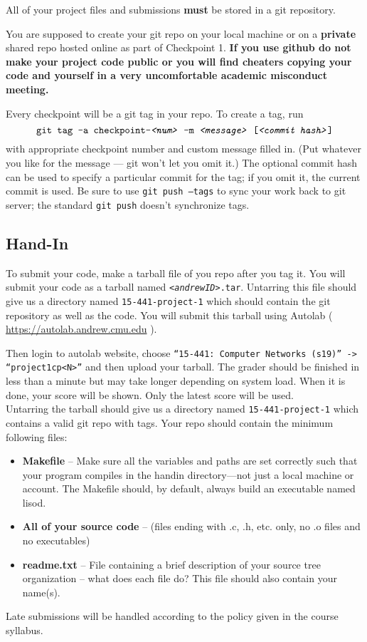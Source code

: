 All of your project files and submissions \textbf{must} be stored in a git repository.

You are supposed to create your git repo on your local machine or on a \textbf{private} shared repo hosted
online as part of
Checkpoint 1. 
{\bf If you use github do not make your project code public or you will find cheaters copying your code and yourself in a very uncomfortable academic misconduct meeting.}

Every checkpoint will be a git tag in your repo. To create a tag, run
\[
\texttt{git tag -a checkpoint-\textit{<num>} -m \textit{<message>} [\textit{<commit hash>}]}
\]
with appropriate checkpoint number and custom message filled in. (Put whatever
you like for the message --- git won't let you omit it.) The optional commit
hash can be used to specify a particular commit for the tag; if you omit it,
the current commit is used. 
Be sure to use \texttt{git push --tags} to sync
your work back to git server; the standard \texttt{git push} doesn't synchronize tags.

\subsection{Hand-In}
\label{sec:handin}

To submit your code, make a tarball file of you repo after you tag it. 
You will submit your code as a tarball named \texttt{\textit{<andrewID>}.tar}. Untarring this file should give us a directory named \texttt{15-441-project-1} which should contain the git repository as well as the code. You will submit this tarball using Autolab ( \url{https://autolab.andrew.cmu.edu} ). 

Then login to autolab website, choose \texttt{“15-441: Computer Networks (s19)” -> “project1cp\textit{<N>}”} and then upload your tarball. The grader should be finished in less than a minute but may take longer depending on system load. When it is done, your score will be shown. Only the latest score will be used.\\


Untarring the tarball should give us a directory named \texttt{15-441-project-1} which contains a valid git repo with tags. Your repo should contain the minimum following files:
\begin{itemize}
	\item \textbf{Makefile} -- Make sure all the variables and paths are set
      correctly such that your program compiles in the handin directory---not
      just a local machine or account. The Makefile should, by default, always
      build an executable named lisod.
	\item \textbf{All of your source code} -- (files ending with .c, .h,
      etc. only, no .o files and no executables)
    \item \textbf{readme.txt} -- File containing a brief description of your source tree organization -- what does each file do? This file should also contain your name(s).
	
\end{itemize}

	Late submissions will be handled according to the policy given in the
        course syllabus.



